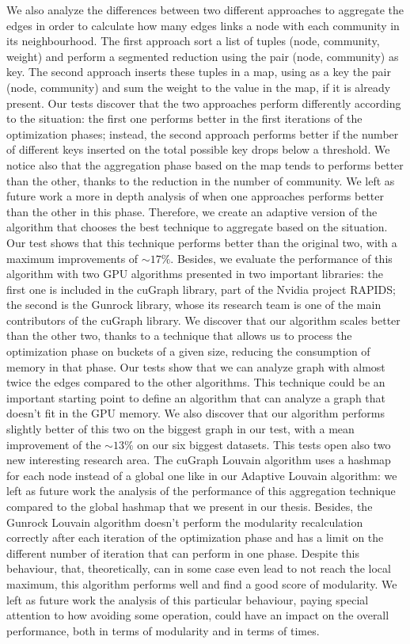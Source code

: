 We also analyze the differences between two different approaches to aggregate the edges in order to calculate how many edges links a node with each community in its neighbourhood. The first approach sort a list of tuples (node, community, weight) and perform a segmented reduction using the pair (node, community) as key. The second approach inserts these tuples in a map, using as a key the pair (node, community) and sum the weight to the value in the map, if it is already present. Our tests discover that the two approaches perform differently according to the situation: the first one performs better in the first iterations of the optimization phases; instead, the second approach performs better if the number of different keys inserted on the total possible key drops below a threshold. We notice also that the aggregation phase based on the map tends to performs better than the other, thanks to the reduction in the number of community. We left as future work a more in depth analysis of when one approaches performs better than the other in this phase. Therefore, we create an adaptive version of the algorithm that chooses the best technique to aggregate based on the situation. Our test shows that this technique performs better than the original two, with a maximum improvements of $\sim 17\%$. Besides, we evaluate the performance of this algorithm with two GPU algorithms presented in two important libraries: the first one is included in the cuGraph library, part of the Nvidia project RAPIDS; the second is the Gunrock library, whose its research team is one of the main contributors of the cuGraph library. We discover that our algorithm scales better than the other two, thanks to a technique that allows us to process the optimization phase on buckets of a given size, reducing the consumption of memory in that phase. Our tests show that we can analyze graph with almost twice the edges compared to the other algorithms. This technique could be an important starting point to 
define an algorithm that can analyze a graph that doesn't fit in the GPU memory.
We also discover that our algorithm performs slightly better of this two on the biggest graph in our test, with a mean improvement of the $\sim 13\%$ on our six biggest datasets. This tests open also two new interesting research area. The cuGraph Louvain algorithm uses a hashmap for each node instead of a global one like in our Adaptive Louvain algorithm: we left as future work the analysis of the performance of this aggregation technique compared to the global hashmap that we present in our thesis. Besides, the Gunrock Louvain algorithm doesn't perform the modularity recalculation correctly after each iteration of the optimization phase and has a limit on the different number of iteration that can perform in one phase. Despite this behaviour, that, theoretically, can in some case even lead to not reach the local maximum, this algorithm performs well and find a good score of modularity. We left as future work the analysis of this particular behaviour, paying special attention to how avoiding some operation, could have an impact on the overall performance, both in terms of modularity and in terms of times.\\
